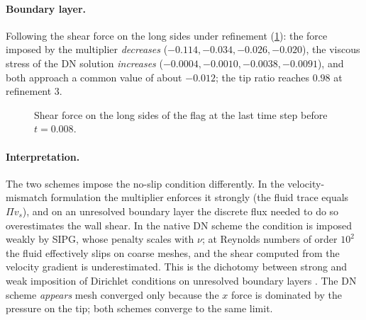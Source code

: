 \documentclass[11pt,a4paper]{article}
\theoremstyle{definition}
\theoremstyle{remark}
\begin{document}
\paragraph{Boundary layer.} Following the shear force on the long sides under refinement
(\cref{fig:shear}): the force imposed by the multiplier \emph{decreases}
($-0.114,-0.034,-0.026,-0.020$), the viscous stress of the DN solution \emph{increases}
($-0.0004,-0.0010,-0.0038,-0.0091$), and both approach a common value of about $-0.012$; the tip
ratio reaches $0.98$ at refinement 3.

\begin{figure}[ht]\centering
{}
\caption{Shear force on the long sides of the flag at the last time step before $t=0.008$.}
\label{fig:shear}
\end{figure}

\paragraph{Interpretation.} The two schemes impose the no-slip condition differently. In the
velocity-mismatch formulation the multiplier enforces it strongly (the fluid trace equals
$\Pi v_s$), and on an unresolved boundary layer the discrete flux needed to do so overestimates the
wall shear. In the native DN scheme the condition is imposed weakly by SIPG, whose penalty scales
with $\nu$; at Reynolds numbers of order $10^2$ the fluid effectively slips on coarse meshes, and the
shear computed from the velocity gradient is underestimated. This is the dichotomy between strong
and weak imposition of Dirichlet conditions on unresolved boundary layers
\cite{BazilevsHughes2007}. The DN scheme \emph{appears} mesh converged only because the
$x$ force is dominated by the pressure on the tip; both schemes converge to the same limit.
\end{document}
